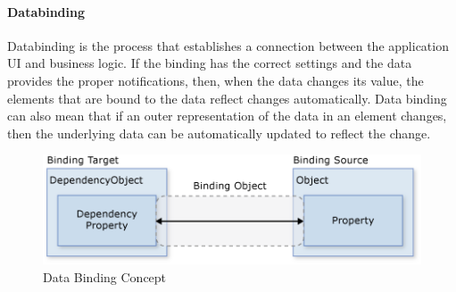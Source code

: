 	\paragraph{Databinding} Databinding is the process that establishes a connection between the application UI and business logic. If the binding has the correct settings and the data provides the proper notifications, then, when the data changes its value, the elements that are bound to the data reflect changes automatically. Data binding can also mean that if an outer representation of the data in an element changes, then the underlying data can be automatically updated to reflect the change. 
		\begin{figure}[H]
			\centering
			\includegraphics[scale=0.7]{Chapters/Fig/data-binding.png}
			\caption{Data Binding Concept}
			\label{fig:data_binding_concept}
		\end{figure}

